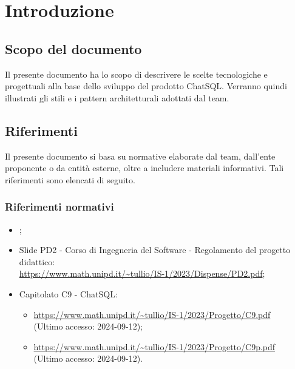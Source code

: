 \section{Introduzione}
\label{sec:introduzione}

\subsection{Scopo del documento}
\par Il presente documento ha lo scopo di descrivere le scelte tecnologiche e progettuali alla base dello sviluppo del prodotto ChatSQL. Verranno quindi illustrati gli stili e i pattern architetturali adottati dal team.

\subsection{Riferimenti}
\par Il presente documento si basa su normative elaborate dal team, dall'ente proponente o da entità esterne, oltre a includere materiali informativi. Tali riferimenti sono elencati di seguito.

\subsubsection{Riferimenti normativi}
\begin{itemize}
  \item \NormeDiProgetto;
  \item Slide PD2 - Corso di Ingegneria del Software - Regolamento del progetto didattico:\\ \href{https://www.math.unipd.it/~tullio/IS-1/2023/Dispense/PD2.pdf}{https://www.math.unipd.it/\textasciitilde tullio/IS-1/2023/Dispense/PD2.pdf};
  \item Capitolato C9 - ChatSQL:
  \begin{itemize}
    \item \href{https://www.math.unipd.it/~tullio/IS-1/2023/Progetto/C9.pdf}{https://www.math.unipd.it/\textasciitilde tullio/IS-1/2023/Progetto/C9.pdf} \\ (Ultimo accesso: 2024-09-12);
    \item \href{https://www.math.unipd.it/~tullio/IS-1/2023/Progetto/C9p.pdf}{https://www.math.unipd.it/\textasciitilde tullio/IS-1/2023/Progetto/C9p.pdf} \\ (Ultimo accesso: 2024-09-12).
  \end{itemize}
\end{itemize}

